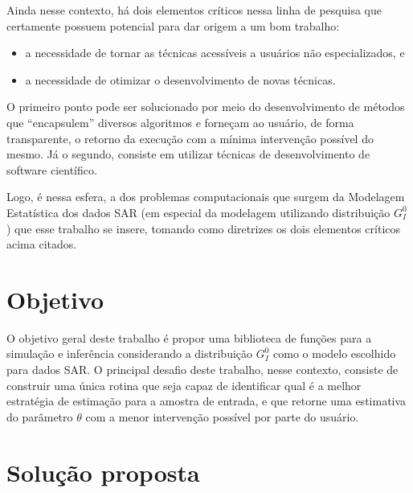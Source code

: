 Ainda nesse contexto, há dois elementos críticos nessa linha de pesquisa que certamente possuem potencial para dar origem a um bom trabalho:
\begin{itemize}
    \item a necessidade de tornar as técnicas acessíveis a usuários não especializados, e
    \item a necessidade de otimizar o desenvolvimento de novas técnicas.
\end{itemize}

O primeiro ponto pode ser solucionado por meio do desenvolvimento de métodos que ``encapsulem'' diversos algoritmos e forneçam ao usuário, de forma transparente, o retorno da execução com a mínima intervenção possível do mesmo. 
Já o segundo, consiste em utilizar técnicas de desenvolvimento de software científico.

Logo, é nessa esfera, a dos problemas computacionais que surgem da Modelagem Estatística dos dados SAR (em especial da modelagem utilizando distribuição $G_I^0$) que esse trabalho se insere, tomando como diretrizes os dois elementos críticos acima citados.

\section{Objetivo}

O objetivo geral deste trabalho é propor uma biblioteca de funções para a simulação e inferência considerando a distribuição $G_I^{0}$ como o modelo escolhido para dados SAR. 
O principal desafio deste trabalho, nesse contexto, consiste de construir uma única rotina que seja capaz de identificar qual é a melhor estratégia de estimação para a amostra de entrada, e que retorne uma estimativa do parâmetro $\theta$ com a menor intervenção possível por parte do usuário.

\section{Solução proposta}

